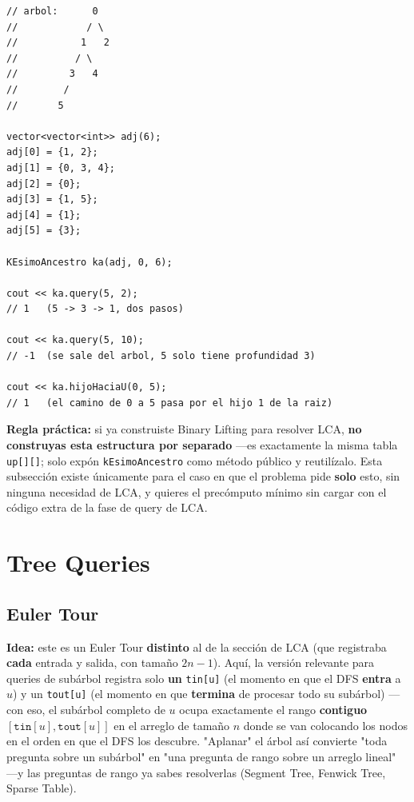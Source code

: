 \documentclass[10pt,a4paper,twocolumn]{article}
\begin{document}
\begin{lstlisting}[style=cpp]
// arbol:      0
//            / \
//           1   2
//          / \
//         3   4
//        /
//       5

vector<vector<int>> adj(6);
adj[0] = {1, 2};
adj[1] = {0, 3, 4};
adj[2] = {0};
adj[3] = {1, 5};
adj[4] = {1};
adj[5] = {3};

KEsimoAncestro ka(adj, 0, 6);

cout << ka.query(5, 2);
// 1   (5 -> 3 -> 1, dos pasos)

cout << ka.query(5, 10);
// -1  (se sale del arbol, 5 solo tiene profundidad 3)

cout << ka.hijoHaciaU(0, 5);
// 1   (el camino de 0 a 5 pasa por el hijo 1 de la raiz)
\end{lstlisting}

\textbf{Regla práctica:} si ya construiste Binary Lifting para
resolver LCA, \textbf{no construyas esta estructura por separado}
—es exactamente la misma tabla \texttt{up[][]}; solo expón
\texttt{kEsimoAncestro} como método público y reutilízalo. Esta
subsección existe únicamente para el caso en que el problema pide
\textbf{solo} esto, sin ninguna necesidad de LCA, y quieres el
precómputo mínimo sin cargar con el código extra de la fase de query
de LCA.



\section{Tree Queries}
\subsection{Euler Tour}

\textbf{Idea:} este es un Euler Tour \textbf{distinto} al de la
sección de LCA (que registraba \textbf{cada} entrada y salida, con
tamaño $2n-1$). Aquí, la versión relevante para queries de subárbol
registra solo \textbf{un} \texttt{tin[u]} (el momento en que el DFS
\textbf{entra} a $u$) y un \texttt{tout[u]} (el momento en que
\textbf{termina} de procesar todo su subárbol) — con eso, el subárbol
completo de $u$ ocupa exactamente el rango \textbf{contiguo}
$[\texttt{tin}[u], \texttt{tout}[u]]$ en el arreglo de tamaño $n$
donde se van colocando los nodos en el orden en que el DFS los
descubre. "Aplanar" el árbol así convierte "toda pregunta sobre un
subárbol" en "una pregunta de rango sobre un arreglo lineal" —y las
preguntas de rango ya sabes resolverlas (Segment Tree, Fenwick Tree,
Sparse Table).
\end{document}
